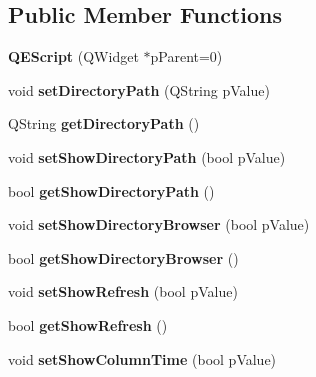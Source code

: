 \subsection*{Public Member Functions}
\begin{DoxyCompactItemize}
\item 
\hypertarget{classQEScript_a85fef0ef4853c9107b3626dfa8ffad70}{
{\bfseries QEScript} (QWidget $\ast$pParent=0)}
\label{classQEScript_a85fef0ef4853c9107b3626dfa8ffad70}

\item 
\hypertarget{classQEScript_a21b36fe2812a3bf1d0cf7a3314a7032d}{
void {\bfseries setDirectoryPath} (QString pValue)}
\label{classQEScript_a21b36fe2812a3bf1d0cf7a3314a7032d}

\item 
\hypertarget{classQEScript_aeb7ab3a332451569ccf6d9b057022468}{
QString {\bfseries getDirectoryPath} ()}
\label{classQEScript_aeb7ab3a332451569ccf6d9b057022468}

\item 
\hypertarget{classQEScript_a0d011b5dfa9413eb3c1114bbd485302b}{
void {\bfseries setShowDirectoryPath} (bool pValue)}
\label{classQEScript_a0d011b5dfa9413eb3c1114bbd485302b}

\item 
\hypertarget{classQEScript_ae77513cfa10e19955a934a8ae4d0c25b}{
bool {\bfseries getShowDirectoryPath} ()}
\label{classQEScript_ae77513cfa10e19955a934a8ae4d0c25b}

\item 
\hypertarget{classQEScript_ac099f9aeb30af59c93fd32e928c8ae9c}{
void {\bfseries setShowDirectoryBrowser} (bool pValue)}
\label{classQEScript_ac099f9aeb30af59c93fd32e928c8ae9c}

\item 
\hypertarget{classQEScript_aa88e1f6da1cb059d67e4a5742df29e43}{
bool {\bfseries getShowDirectoryBrowser} ()}
\label{classQEScript_aa88e1f6da1cb059d67e4a5742df29e43}

\item 
\hypertarget{classQEScript_a1a5327a0e895dbfef610389eca8c8d73}{
void {\bfseries setShowRefresh} (bool pValue)}
\label{classQEScript_a1a5327a0e895dbfef610389eca8c8d73}

\item 
\hypertarget{classQEScript_a3f87c9531f139285dd2c957cb172ef3d}{
bool {\bfseries getShowRefresh} ()}
\label{classQEScript_a3f87c9531f139285dd2c957cb172ef3d}

\item 
\hypertarget{classQEScript_a5c387c06e2de258887600677ead624e8}{
void {\bfseries setShowColumnTime} (bool pValue)}
\label{classQEScript_a5c387c06e2de258887600677ead624e8}


\end{DoxyCompactItemize}
